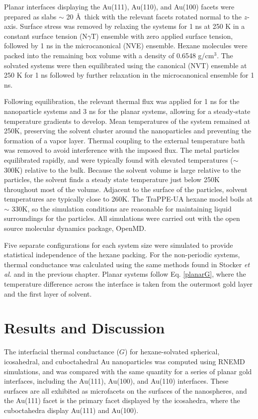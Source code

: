 Planar interfaces displaying the Au(111), Au(110), and Au(100) facets
were prepared as slabs $\sim$ 20 \AA\ thick with the relevant facets
rotated normal to the $z$-axis. Surface stress was removed by relaxing
the systems for 1 ns at 250 K in a constant surface tension
(N\(\gamma\)T) ensemble with zero applied surface tension, followed by
1 ns in the microcanonical (NVE) ensemble.  Hexane molecules were
packed into the remaining box volume with a density of 0.6548
g/cm$^3$. The solvated systems were then equilibrated using the
canonical (NVT) ensemble at 250 K for 1 ns followed by further
relaxation in the microcanonical ensemble for 1 ns.

Following equilibration, the relevant thermal flux was applied for 1
ns for the nanoparticle systems and 3 ns for the planar systems,
allowing for a steady-state temperature gradients to develop. Mean
temperatures of the system remained at 250K, preserving the solvent
cluster around the nanoparticles and preventing the formation of a
vapor layer. Thermal coupling to the external temperature bath was
removed to avoid interference with the imposed flux. The metal
particles equilibrated rapidly, and were typically found with elevated
temperatures ($\sim$300K) relative to the bulk. Because the solvent
volume is large relative to the particles, the solvent finds a steady
state temperature just below 250K throughout most of the
volume. Adjacent to the surface of the particles, solvent temperatures
are typically close to 260K. The TraPPE-UA hexane model boils at
$\sim$ 330K, so the simulation conditions are reasonable for
maintaining liquid surroundings for the particles.  All simulations
were carried out with the open source molecular dynamics package,
OpenMD.\cite{openmd,OOPSE}

Five separate configurations for each system size were simulated to
provide statistical independence of the hexane packing.  For the non-periodic systems, thermal
conductance was calculated using the same methods found in Stocker
\textit{et al.}\cite{Stocker2016} and in the previous chapter.
Planar systems follow Eq. \ref{planarG}, where the temperature difference across the interface is taken from the outermost gold layer and the first layer of solvent. 

\section{Results and Discussion}
The interfacial thermal conductance ($G$) for hexane-solvated
spherical, icosahedral, and cuboctahedral Au nanoparticles was
computed using RNEMD simulations, and was compared with the same
quantity for a series of planar gold interfaces, including the
Au(111), Au(100), and Au(110) interfaces.  These surfaces are all
exhibited as microfacets on the surfaces of the nanospheres, and the
Au(111) facet is the primary facet displayed by the icosahedra,
where the cuboctahedra display Au(111) and Au(100).

